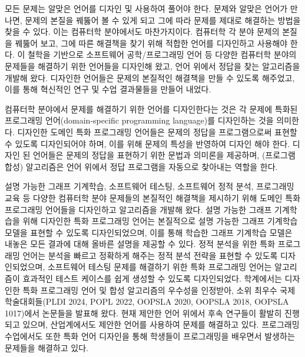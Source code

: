 \documentclass[11pt]{article}
\begin{document}
\begin{spacing}{1.145}
모든 문제는 알맞은 언어를 디자인 및 사용하여 풀어야 한다.
%
문제와 알맞은 언어가 만나면, 문제의 본질을 꿰뚫어 볼 수 있게 되고 그에 따라 문제를 제대로 해결하는 방법을 찾을 수 있다.
%
이는 컴퓨터학 분야에서도 마찬가지이다.
%
컴퓨터학 각 분야 문제의 본질을 꿰뚫어 보고, 그에 따른 해결책을 찾기 위해 적합한 언어를 디자인하고 사용해야 한다.
%
이 철학을 기반으로 소프트웨어 공학/프로그래밍 언어 등 다양한 컴퓨터학 분야의 문제들을 해결하기 위한 언어들을 디자인해 왔고, 언어 위에서 정답을 찾는 알고리즘을 개발해 왔다.
%
디자인한 언어들은 문제의 본질적인 해결책을 만들 수 있도록 해주었고, 이를 통해 혁신적인 연구 및 수업 결과물들을 만들어 내었다.
%


컴퓨터학 분야에서 문제를 해결하기 위한 언어를 디자인한다는 것은 각 문제에 특화된 프로그래밍 언어(domain-specific programming language)를 디자인하는 것을 의미한다.
%
디자인한 도메인 특화 프로그래밍 언어들은 문제의 정답을 프로그램으로써 표현할 수 있도록 디자인되어야 하며, 이를 위해 문제의 특성을 반영하여 디자인 해야 한다.
%
디자인 된 언어들은 문제의 정답을 표현하기 위한 문법과 의미론을 제공하며, (프로그램 합성) 알고리즘은 언어 위에서 정답 프로그램을 자동으로 찾아내는 역할을 한다.

    


설명 가능한 그래프 기계학습, 소프트웨어 테스팅, 소프트웨어 정적 분석, 프로그래밍 교육 등 다양한 컴퓨터학 분야 문제들의 본질적인 해결책을 제시하기 위해 도메인 특화 프로그래밍 언어들을 디자인하고 알고리즘을 개발해 왔다.
%
설명 가능한 그래프 기계학습을 위해 디자인한 특화 프로그래밍 언어는 본질적으로 설명 가능한 그래프 기계학습 모델을 표현할 수 있도록 디자인되었으며, 이를 통해 학습한 그래프 기계학습 모델은 내놓은 모든 결과에 대해 올바른 설명을 제공할 수 있다.
%
정적 분석을 위한 특화 프로그래밍 언어는 분석을 빠르고 정확하게 해주는 정적 분석 전략을 표현할 수 있도록 디자인되었으며, 소프트웨어 테스팅 문제를 해결하기 위한 특화 프로그래밍 언어는 알고리즘이 효과적인 테스트 케이스를 쉽게 생성할 수 있도록 디자인되었다.
%
학계에서는 디자인한 특화 프로그래밍 언어 및 합성 알고리즘의 우수성을 인정받아, 소위 최우수 국제 학술대회들(PLDI 2024, POPL 2022, OOPSLA 2020, OOPSLA 2018, OOPSLA 1017)에서 논문들을 발표해 왔다.
%
현재 제안한 언어 위에서 후속 연구들이 활발히 진행되고 있으며, 산업계에서도 제안한 언어를 사용하여 문제를 해결하고 있다.
%
프로그래밍 수업에서도 또한 특화 언어 디자인을 통해 학생들이 프로그래밍을 배우면서 발생하는 문제들을 해결하고 있다.






\end{spacing}
\end{document}

